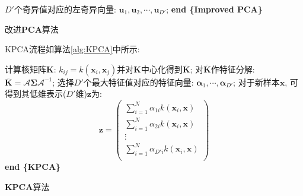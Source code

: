 \documentclass{article}
\begin{document}
\begin{homeworkProblem}
\begin{itemize}
\begin{algorithm}[H]
\begin{algorithmic}[1]
			\State $D'$个奇异值对应的左奇异向量: $\boldsymbol{u}_1,\boldsymbol{u}_2,\cdots ,\boldsymbol{u}_{D'}$;
			\State \textbf{end \{Improved PCA\}}
			\end{algorithmic}
			\caption{改进\textbf{PCA}算法}
			\label{alg:PCA2}
		\end{algorithm}
		KPCA流程如算法\ref{alg:KPCA}中所示:
		\begin{algorithm}[H]
			\begin{algorithmic}[1]
			\State 计算核矩阵$\boldsymbol{K}$: $k_{ij}=k(\boldsymbol{x}_i,\boldsymbol{x}_j)$并对$\boldsymbol{K}$中心化得到$\overline{\boldsymbol{K}}$;
			\State 对$\overline{\boldsymbol{K}}$作特征分解: $\overline{\boldsymbol{K}}=\boldsymbol{\mathcal{A}} \boldsymbol{\Sigma }\boldsymbol{\mathcal{A}} ^{-1}$;
			\State 选择$D'$个最大特征值对应的特征向量: $\boldsymbol{\alpha}_1,\cdots ,\boldsymbol{\alpha}_{D'}$; 
			\State 对于新样本$\boldsymbol{x}$, 可得到其低维表示($D'$维)$\boldsymbol{z}$为: 
			$$
			\boldsymbol{z}=\left( \begin{array}{c}
				\displaystyle \sum_{i=1}^N{\alpha _{1i}k\left( \boldsymbol{x}_i,\boldsymbol{x} \right)}\\
				\displaystyle \sum_{i=1}^N{\alpha _{2i}k\left( \boldsymbol{x}_i,\boldsymbol{x} \right)}\\
				\vdots\\
				\displaystyle \sum_{i=1}^N{\alpha _{D'i}k\left( \boldsymbol{x}_i,\boldsymbol{x} \right)}\\
			\end{array} \right)
			$$
			\State \textbf{end \{KPCA\}}
			\end{algorithmic}
			\caption{\textbf{KPCA}算法}
			\label{alg:KPCA}
		\end{algorithm}
	\end{itemize}
\end{homeworkProblem}


%
\end{document}
